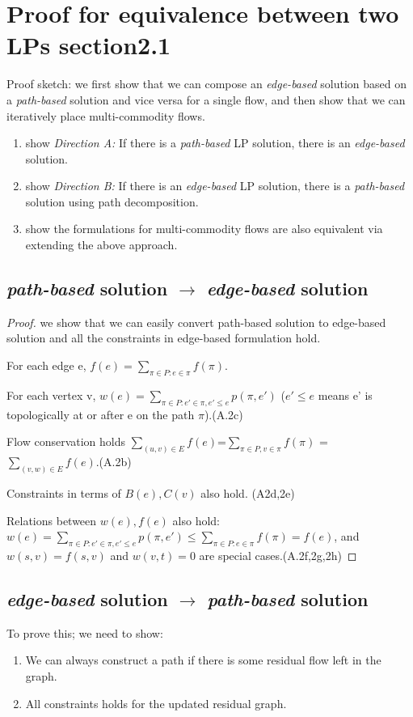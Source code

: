 \appendix
\section{Proof for equivalence between two LPs section2.1}
Proof sketch: we first show that we can compose an \emph{edge-based} solution based on a \emph{path-based} solution and vice versa for a single flow, and then show that we can iteratively place multi-commodity flows. 
\begin{enumerate}
\item show \emph{Direction A:} If there is a \emph{path-based} LP solution, there is an \emph{edge-based} solution.
\item show \emph{Direction B:} If there is an \emph{edge-based} LP solution, there is a \emph{path-based} solution using path decomposition.
\item show the formulations for multi-commodity flows are also equivalent via extending the above approach.
\end{enumerate}

\subsection{\emph{path-based} solution $\rightarrow$ \emph{edge-based} solution}
\begin{proof}
we show that we can easily convert path-based solution to edge-based solution and all the constraints in edge-based formulation hold.

For each edge e, $f(e) =\sum\limits_{\pi\in P: e\in \pi} f(\pi)$.

For each vertex v, $w(e) = \sum\limits_{\pi\in P: e'\in \pi, e' \leq e} p(\pi, e')$ ($e'\leq e$ means e' is topologically at or after e on the path $\pi$).(A.2c)

Flow conservation holds $ \sum\limits_{(u,v)\in E} f(e) $=$ \sum\limits_{\pi\in P, v\in \pi} f(\pi)$ = $\sum\limits_{(v,w )\in E} f(e)$.(A.2b)

Constraints in terms of $B(e), C(v)$ also hold. (A2d,2e)

Relations between $w(e), f(e)$ also hold: $w(e)= \sum\limits_{\pi\in P: e'\in \pi, e' \leq e} p(\pi, e')\leq \sum\limits_{\pi\in P: e\in \pi} f(\pi) = f(e) $, and $w(s,v)=f(s,v)$ and $w(v,t)=0$ are special cases.(A.2f,2g,2h)

\end{proof}

\subsection{\emph{edge-based} solution $\rightarrow$ \emph{path-based} solution}
To prove this; we need to show:
\begin{enumerate}
 \item We can always construct a path if there is some residual flow left in the graph.
 \item All constraints holds for the updated residual graph.
 
\end{enumerate}

